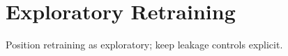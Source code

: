 \section{Exploratory Retraining}
Position retraining as exploratory; keep leakage controls explicit.
